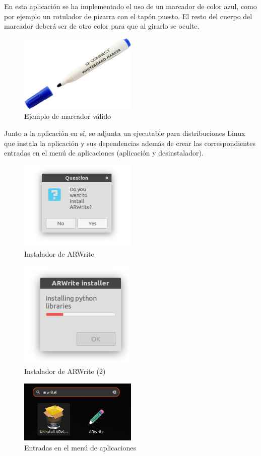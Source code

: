 \documentclass[12pt,spanish]{article}
\begin{document}
En esta aplicación se ha implementado el uso de un marcador de color azul, como por ejemplo un rotulador de pizarra con el tapón puesto. El resto del cuerpo del marcador deberá ser de otro color para que al girarlo se oculte.

\begin{figure}[H]
	\centering
	\includegraphics[width=0.5\textwidth]{rotulador.jpg}
	\caption{Ejemplo de marcador válido}
\end{figure}

Junto a la aplicación en sí, se adjunta un ejecutable para distribuciones Linux que instala la aplicación y sus dependencias además de crear las correspondientes entradas en el menú de aplicaciones (aplicación y desinstalador).
\begin{figure}[H]
	\centering
	\includegraphics[width=0.5\textwidth]{installer.png}
	\caption{Instalador de ARWrite}
\end{figure}
\begin{figure}[H]
	\centering
	\includegraphics[width=0.5\textwidth]{installer2.png}
	\caption{Instalador de ARWrite (2)}
\end{figure}
\begin{figure}[H]
	\centering
	\includegraphics[width=0.5\textwidth]{entries.png}
	\caption{Entradas en el menú de aplicaciones}
\end{figure}
\end{document}
